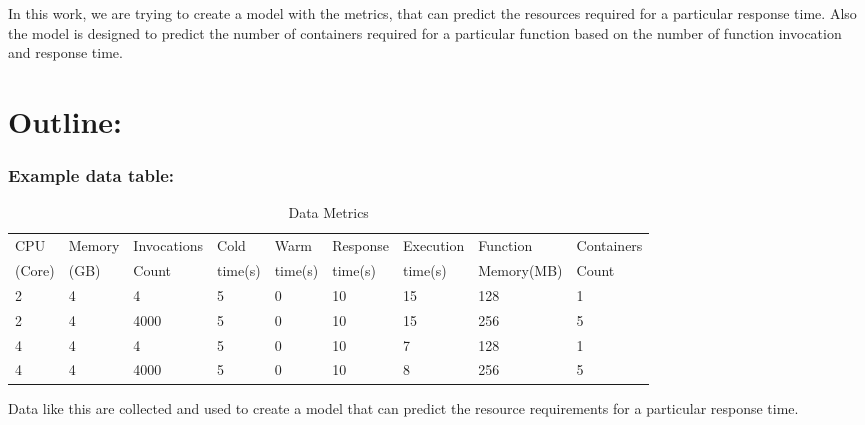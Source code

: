 In this work, we are trying to create a model with the metrics, that can predict the resources required for a particular response time. 
Also the model is designed to predict the number of containers required for a particular function based on the number of function invocation and response time. 

\section{Outline:}

\subsubsection{Example data table:}
\begin{table}[htpb]
    \caption[Data table]{Data Metrics}\label{tab:sample}
    \centering
    \begin{tabular}{l l l l l l l l l}
      \toprule
        CPU & Memory & Invocations & Cold & Warm & Response & Execution& Function & Containers \\
        (Core) & (GB) & Count & time(s) & time(s) & time(s) & time(s) & Memory(MB) & Count \\
      \midrule
        2 & 4 & 4 & 5 & 0 & 10 & 15 & 128 & 1 \\
        2 & 4 & 4000 & 5 & 0 & 10 & 15 & 256 & 5 \\
        4 & 4 & 4 & 5 & 0 & 10 & 7 & 128 & 1 \\
        4 & 4 & 4000 & 5 & 0 & 10 & 8 & 256 & 5 \\ 
      \bottomrule
    \end{tabular}
  \end{table}

  Data like this are collected and used to create a model that can predict the resource requirements for a particular response time.































